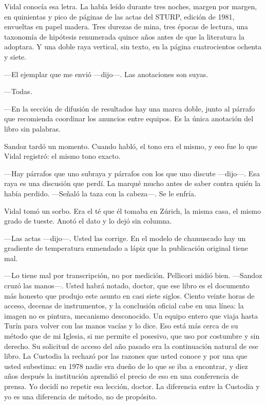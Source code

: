 Vidal conocía esa letra. La había leído durante tres noches, margen por margen, en quinientas y pico de páginas de las actas del STURP, edición de 1981, envueltas en papel madera. Tres durezas de mina, tres épocas de lectura, una taxonomía de hipótesis renumerada quince años antes de que la literatura la adoptara. Y una doble raya vertical, sin texto, en la página cuatrocientos ochenta y siete.

---El ejemplar que me envió ---dijo---. Las anotaciones son suyas.

---Todas.

---En la sección de difusión de resultados hay una marca doble, junto al párrafo que recomienda coordinar los anuncios entre equipos. Es la única anotación del libro sin palabras.

Sandoz tardó un momento. Cuando habló, el tono era el mismo, y eso fue lo que Vidal registró: el mismo tono exacto.

---Hay párrafos que uno subraya y párrafos con los que uno discute ---dijo---. Esa raya es una discusión que perdí. La marqué mucho antes de saber contra quién la había perdido. ---Señaló la taza con la cabeza---. Se le enfría.

Vidal tomó un sorbo. Era el té que él tomaba en Zúrich, la misma casa, el mismo grado de tueste. Anotó el dato y lo dejó sin columna.

---Las actas ---dijo---. Usted las corrige. En el modelo de chamuscado hay un gradiente de temperatura enmendado a lápiz que la publicación original tiene mal.

---Lo tiene mal por transcripción, no por medición. Pellicori midió bien. ---Sandoz cruzó las manos---. Usted habrá notado, doctor, que ese libro es el documento más honesto que produjo este asunto en casi siete siglos. Ciento veinte horas de acceso, decenas de instrumentos, y la conclusión oficial cabe en una línea: la imagen no es pintura, mecanismo desconocido. Un equipo entero que viaja hasta Turín para volver con las manos vacías y lo dice. Eso está más cerca de su método que de mi Iglesia, si me permite el posesivo, que uso por costumbre y sin derecho. Su solicitud de acceso del año pasado era la continuación natural de ese libro. La Custodia la rechazó por las razones que usted conoce y por una que usted subestima: en 1978 nadie era dueño de lo que se iba a encontrar, y diez años después la institución aprendió el precio de eso en una conferencia de prensa. Yo decidí no repetir esa lección, doctor. La diferencia entre la Custodia y yo es una diferencia de método, no de propósito.


